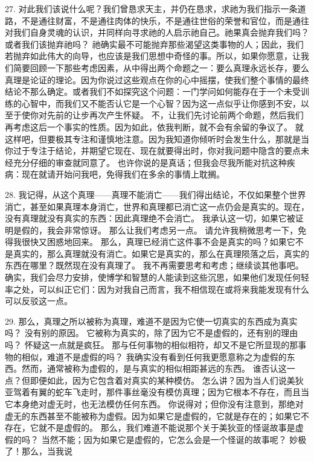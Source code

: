 27. 对此我们该说什么呢？我们曾恳求天主，并仍在恳求，求祂为我们指示一条道路，不是通往财富，不是通往肉体的快乐，不是通往世俗的荣誉和官位，而是通往对我们自身灵魂的认识，并同样向寻求祂的人启示祂自己。祂果真会抛弃我们吗？或者我们该抛弃祂吗？ 祂确实最不可能抛弃那些渴望这类事物的人；因此，我们若抛弃如此伟大的向导，也应该是我们思想中奇怪的事。所以，如果你愿意，让我们简要回顾一下那些考虑因素，从中得出两个命题之一：要么真理永远长存，要么真理是论证的理论。因为你说过这些观点在你的心中摇摆，使我们整个事情的最终结论不那么确定。或者我们不如探究这个问题：一门学问如何能存在于一个未受训练的心智中，而我们又不能否认它是一个心智？因为这一点似乎让你感到不安，以至于使你对先前的让步再次产生怀疑。 不，让我们先讨论前两个命题，然后我们再考虑这后一个事实的性质。因为如此，依我判断，就不会有余留的争议了。 就这样吧，但要极其专注和谨慎地注意。因为我知道你倾听时会发生什么，那就是当你过于专注于结论，并期望它现在、现在就要得出时，你对我问题中隐含的要点未经充分仔细的审查就同意了。 也许你说的是真话；但我会尽我所能对抗这种疾病：现在就请开始问我吧，免得我们在多余的事情上耽搁。\par

28.  我记得，从这个真理——真理不能消亡——我们得出结论，不仅如果整个世界消亡，甚至如果真理本身消亡，世界和真理都已消亡这一点仍会是真实的。现在，没有真理就没有真实的东西：因此真理绝不会消亡。 我承认这一切，如果它被证明是假的，我会非常惊讶。 那么让我们考虑另一点。 请允许我稍微思考一下，免得我很快又困惑地回来。 那么，真理已经消亡这件事不会是真实的吗？如果它不是真实的，那么真理就没有消亡。如果它是真实的，那么在真理陨落之后，真实的东西在哪里？既然现在没有真理了。 我不再需要思考和考虑；继续谈其他事吧。确实，我们会尽力安排，使博学和智慧的人能读到这些沉思，如果他们发现任何轻率之处，可以纠正它们：因为对我自己而言，我不相信现在或将来我能发现有什么可以反驳这一点。\par

29.  那么，真理之所以被称为真理，难道不是因为它使一切真实的东西成为真实吗？ 没有别的原因。 它被称为真实的，除了因为它不是虚假的，还有别的理由吗？ 怀疑这一点就是疯狂。 那与任何事物的相似相符，却又不是它所显现的那事物的相似，难道不是虚假的吗？ 我确实没有看到任何我更愿意称之为虚假的东西。然而，通常被称为虚假的，是与真实的相似相距甚远的东西。 谁否认这一点？但即便如此，因为它包含着对真实的某种模仿。 怎么讲？因为当人们说美狄亚驾着有翼的蛇车飞走时，那件事丝毫没有模仿真理；因为它根本不存在，而且当它本身绝对虚无时，也无法模仿任何东西。 你说得对；但你没有注意到，那绝对虚无的东西甚至不能被称为虚假。因为如果它是虚假的，它就是存在的；如果它不存在，它就不是虚假的。 那么，我们难道不能说那个关于美狄亚的怪诞故事是虚假的吗？ 当然不能；因为如果它是虚假的，它怎么会是一个怪诞的故事呢？ 妙极了！那么，当我说\par

